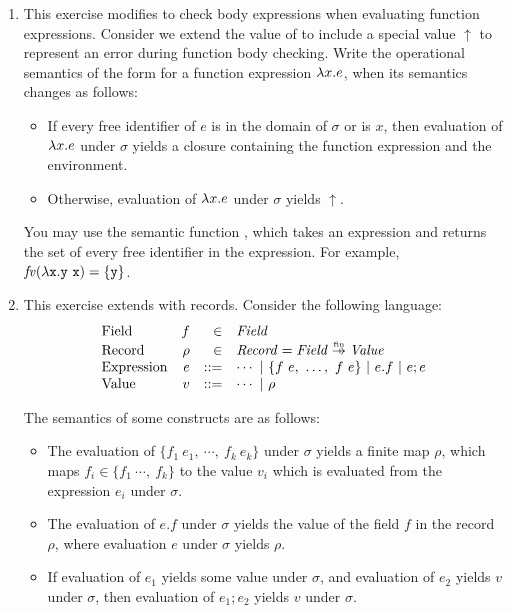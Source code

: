 \begin{enumerate}
\item This exercise modifies \lang to check body expressions when evaluating
  function expressions.
Consider we extend the value of \lang to include a special value $\uparrow$
to represent an error during function body checking.
Write the operational semantics of the form
 for a function expression
$\lambda x.e$, when its semantics  changes as follows:
\begin{itemize}
\item If every free identifier of $e$ is in the domain of $\sigma$ or is $x$,
  then evaluation of $\lambda x.e$ under $\sigma$ yields a closure
  containing the function expression and the environment.
\item Otherwise, evaluation of $\lambda x.e$ under $\sigma$ yields $\uparrow$.
\end{itemize}
You may use the semantic function , which takes an
expression and returns the set of every free identifier in the expression.
For example, $\mbox{\emph{fv}}(\lambda\texttt{x}.\texttt{y}\ \texttt{x}) = \{ \texttt{y} \}$.

\item This exercise extends \lang with records.
  Consider the following language:
\[
\begin{array}{lrrl}
  \text{Field} & f & \in & \textit{Field} \\
  \text{Record} & \rho & \in & \embox{Record} = \embox{Field} \finto \embox{Value} \\
  \text{Expression}& e & ::= & \cdots\ |\ \{f\ e,\ \ldots,\ f\ e\}\ |\ e.f\ |\
  e;e \\
  \text{Value} & v & ::= & \cdots\ |\ \rho \\
\end{array}
\]

The semantics of some constructs are as follows:
\begin{itemize}
  \item The evaluation of $\{f_1\ e_1,\ \cdots,\ f_k\ e_k\}$
    under $\sigma$ yields a finite map $\rho$,
which maps $f_i \in \{f_1\ \cdots,\ f_k\}$
to the value $v_i$ which is evaluated from the expression $e_i$ under $\sigma$.
  \item The evaluation of $e.f$ under $\sigma$ yields the value of the field $f$ in the record $\rho$,
      where evaluation $e$ under $\sigma$ yields $\rho$.
  \item If evaluation of $e_1$ yields some value under $\sigma$, and evaluation
    of $e_2$ yields $v$ under $\sigma$,
      then evaluation of $e_1; e_2$ yields $v$ under $\sigma$.
\end{itemize}


\end{enumerate}
